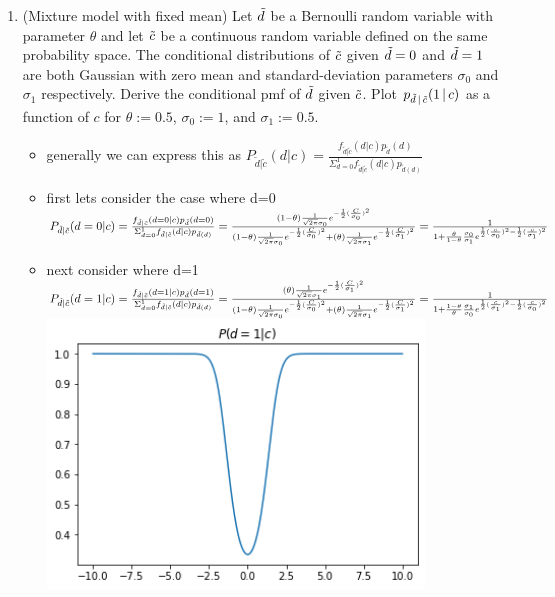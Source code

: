 \documentclass[12pt,twoside]{article}
\begin{document}
\begin{enumerate}
\begin{enumerate}
\begin{itemize}
\end{itemize}
\end{enumerate}

\item (Mixture model with fixed mean) Let $\tilde{ d }$ be a Bernoulli random variable with parameter $\theta$ and let $\tilde{ c }$ be a continuous random variable defined on the same probability space. The conditional distributions of $\tilde{ c }$ given $\tilde{ d }=0$ and $\tilde{ d }=1$ are both Gaussian with zero mean and standard-deviation parameters $\sigma_0$ and $\sigma_1$ respectively. Derive the conditional pmf of $\tilde{ d }$ given $\tilde{ c }$. Plot $p_{\tilde{ d } \, | \, \tilde{ c }}(1 \, | \, c) $ as a function of $c$ for $\theta:=0.5$, $\sigma_0:=1$, and $\sigma_1:=0.5$.


\begin{itemize}
    \item generally we can express this as $P_{\tilde{d}|\tilde{c}}(d|c)=\frac{f_{\tilde{d}|\tilde{c}}(d|c)p_{\tilde{d}}(d)}{\Sigma_{d=0}^{1}f_{\tilde{d}|\tilde{c}}(d|c)p_{\tilde{d}(d)}}$
    \item first lets consider the case where d=0
    $P_{\tilde{d}|\tilde{c}}(d=0|c)=\frac{f_{\tilde{d}|\tilde{c}}(d=0|c)p_{\tilde{d}}(d=0)}{\Sigma_{d=0}^{1}f_{\tilde{d}|\tilde{c}}(d|c)p_{\tilde{d}(d)}}=\\\frac{(1-\theta)\frac{1}{\sqrt{2\pi}\sigma_{0}}e^{-\frac{1}{2}(\frac{C}{\sigma_0})^{2}}}{(1-\theta)\frac{1}{\sqrt{2\pi}\sigma_{0}}e^{-\frac{1}{2}(\frac{C}{\sigma_0})^{2}}+(\theta)\frac{1}{\sqrt{2\pi}\sigma_{1}}e^{-\frac{1}{2}(\frac{C}{\sigma_1})^{2}}}=\frac{1}{1+\frac{\theta}{1-\theta}\frac{\sigma_0}{\sigma_1}e^{\frac{1}{2}(\frac{c}{\sigma_0})^2-\frac{1}{2}(\frac{c}{\sigma_1})^2}}$
    \item next consider where d=1
    $P_{\tilde{d}|\tilde{c}}(d=1|c)=\frac{f_{\tilde{d}|\tilde{c}}(d=1|c)p_{\tilde{d}}(d=1)}{\Sigma_{d=0}^{1}f_{\tilde{d}|\tilde{c}}(d|c)p_{\tilde{d}(d)}}=\\\frac{(\theta)\frac{1}{\sqrt{2\pi}\sigma_{1}}e^{-\frac{1}{2}(\frac{C}{\sigma_1})^{2}}}{(1-\theta)\frac{1}{\sqrt{2\pi}\sigma_{0}}e^{-\frac{1}{2}(\frac{C}{\sigma_0})^{2}}+(\theta)\frac{1}{\sqrt{2\pi}\sigma_{1}}e^{-\frac{1}{2}(\frac{C}{\sigma_1})^{2}}}=\frac{1}{1+\frac{1-\theta}{\theta}\frac{\sigma_1}{\sigma_0}e^{\frac{1}{2}(\frac{c}{\sigma_1})^2-\frac{1}{2}(\frac{c}{\sigma_0})^2}}$
    \\\includegraphics[width=10cm]{homework 8/homework_8_question_3.png}
\end{itemize}


\end{enumerate}
\end{document}
